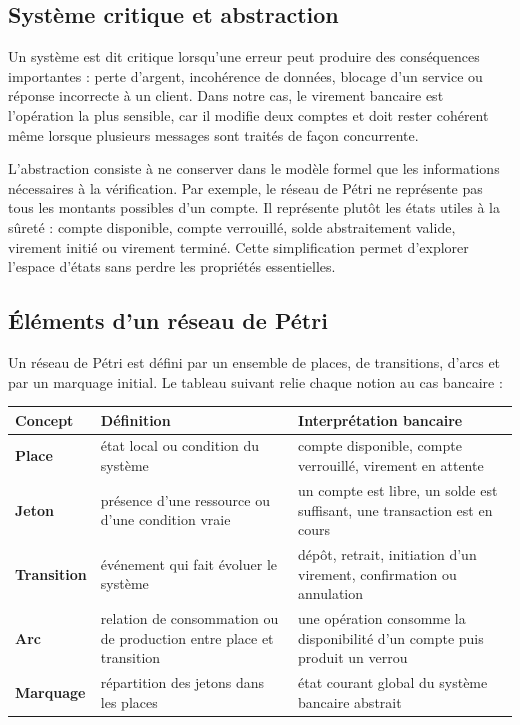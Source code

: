 \documentclass[11pt,a4paper]{article}
\begin{document}
\subsection{Système critique et abstraction}

Un système est dit critique lorsqu'une erreur peut produire des conséquences importantes : perte d'argent, incohérence de données, blocage d'un service ou réponse incorrecte à un client. Dans notre cas, le virement bancaire est l'opération la plus sensible, car il modifie deux comptes et doit rester cohérent même lorsque plusieurs messages sont traités de façon concurrente.

L'abstraction consiste à ne conserver dans le modèle formel que les informations nécessaires à la vérification. Par exemple, le réseau de Pétri ne représente pas tous les montants possibles d'un compte. Il représente plutôt les états utiles à la sûreté : compte disponible, compte verrouillé, solde abstraitement valide, virement initié ou virement terminé. Cette simplification permet d'explorer l'espace d'états sans perdre les propriétés essentielles.

\subsection{Éléments d'un réseau de Pétri}

Un réseau de Pétri est défini par un ensemble de places, de transitions, d'arcs et par un marquage initial. Le tableau suivant relie chaque notion au cas bancaire :

\begin{center}
\begin{tabularx}{\textwidth}{>{\bfseries}l X X}
\toprule
Concept & Définition & Interprétation bancaire \\
\midrule
Place & état local ou condition du système & compte disponible, compte verrouillé, virement en attente \\
Jeton & présence d'une ressource ou d'une condition vraie & un compte est libre, un solde est suffisant, une transaction est en cours \\
Transition & événement qui fait évoluer le système & dépôt, retrait, initiation d'un virement, confirmation ou annulation \\
Arc & relation de consommation ou de production entre place et transition & une opération consomme la disponibilité d'un compte puis produit un verrou \\
Marquage & répartition des jetons dans les places & état courant global du système bancaire abstrait \\
\bottomrule
\end{tabularx}
\end{center}
\end{document}
